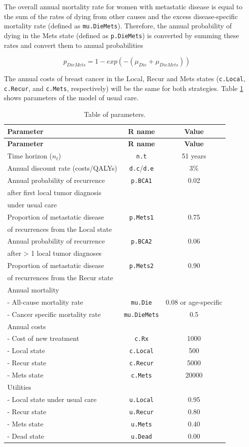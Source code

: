 \documentclass[]{article}
\theoremstyle{definition}
\theoremstyle{definition}
\theoremstyle{definition}
\theoremstyle{remark}
\begin{document}
The overall annual mortality rate for women with metastatic disease is
equal to the sum of the rates of dying from other causes and the excess
disease-specific mortality rate (defined as \texttt{mu.DieMets}).
Therefore, the annual probability of dying in the Mets state (defined as
\texttt{p.DieMets}) is converted by summing these rates and convert them
to annual probabilities

\[
  p_{DieMets} = 1-exp(-(\mu_{Die}+\mu_{DieMets}))
\]

The annual costs of breast cancer in the Local, Recur and Mets states
(\texttt{c.Local}, \texttt{c.Recur}, and \texttt{c.Mets}, respectively)
will be the same for both strategies. Table \ref{tab:param-table} shows
parameters of the model of usual care.

\begin{longtable}[]{@{}lcc@{}}
\caption{\label{tab:param-table} Table of parameters.}\tabularnewline
\toprule
\textbf{Parameter} & \textbf{R name} & \textbf{Value}\tabularnewline
\midrule
\endfirsthead
\toprule
\textbf{Parameter} & \textbf{R name} & \textbf{Value}\tabularnewline
\midrule
\endhead
Time horizon (\(n_t\)) & \texttt{n.t} & 51 years\tabularnewline
Annual discount rate (costs/QALYs) & \texttt{d.c}/\texttt{d.e} &
3\%\tabularnewline
Annual probability of recurrence & \texttt{p.BCA1} & 0.02\tabularnewline
after first local tumor diagnosis & &\tabularnewline
under usual care & &\tabularnewline
Proportion of metastatic disease & \texttt{p.Mets1} &
0.75\tabularnewline
of recurrences from the Local state & &\tabularnewline
Annual probability of recurrence & \texttt{p.BCA2} & 0.06\tabularnewline
after \textgreater{} 1 local tumor diagnoses & &\tabularnewline
Proportion of metastatic disease & \texttt{p.Mets2} &
0.90\tabularnewline
of recurrences from the Recur state & &\tabularnewline
Annual mortality & &\tabularnewline
- All-cause mortality rate & \texttt{mu.Die} & 0.08 or
age-specific\tabularnewline
- Cancer specific mortality rate & \texttt{mu.DieMets} &
0.5\tabularnewline
Annual costs & &\tabularnewline
- Cost of new treatment & \texttt{c.Rx} & 1000\tabularnewline
- Local state & \texttt{c.Local} & 500\tabularnewline
- Recur state & \texttt{c.Recur} & 5000\tabularnewline
- Mets state & \texttt{c.Mets} & 20000\tabularnewline
Utilities & &\tabularnewline
- Local state under usual care & \texttt{u.Local} & 0.95\tabularnewline
- Recur state & \texttt{u.Recur} & 0.80\tabularnewline
- Mets state & \texttt{u.Mets} & 0.40\tabularnewline
- Dead state & \texttt{u.Dead} & 0.00\tabularnewline
\bottomrule
\end{longtable}
\end{document}
